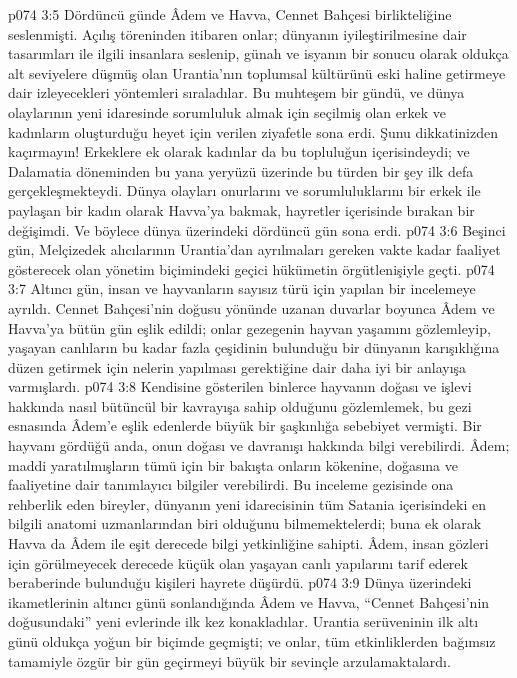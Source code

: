 \vs p074 3:5 Dördüncü günde Âdem ve Havva, Cennet Bahçesi birlikteliğine seslenmişti. Açılış töreninden itibaren onlar; dünyanın iyileştirilmesine dair tasarımları ile ilgili insanlara seslenip, günah ve isyanın bir sonucu olarak oldukça alt seviyelere düşmüş olan Urantia’nın toplumsal kültürünü eski haline getirmeye dair izleyecekleri yöntemleri sıraladılar. Bu muhteşem bir gündü, ve dünya olaylarının yeni idaresinde sorumluluk almak için seçilmiş olan erkek ve kadınların oluşturduğu heyet için verilen ziyafetle sona erdi. Şunu dikkatinizden kaçırmayın! Erkeklere ek olarak kadınlar da bu topluluğun içerisindeydi; ve Dalamatia döneminden bu yana yeryüzü üzerinde bu türden bir şey ilk defa gerçekleşmekteydi. Dünya olayları onurlarını ve sorumluluklarını bir erkek ile paylaşan bir kadın olarak Havva’ya bakmak, hayretler içerisinde bırakan bir değişimdi. Ve böylece dünya üzerindeki dördüncü gün sona erdi.
\vs p074 3:6 Beşinci gün, Melçizedek alıcılarının Urantia’dan ayrılmaları gereken vakte kadar faaliyet gösterecek olan yönetim biçimindeki geçici hükümetin örgütlenişiyle geçti.
\vs p074 3:7 Altıncı gün, insan ve hayvanların sayısız türü için yapılan bir incelemeye ayrıldı. Cennet Bahçesi’nin doğusu yönünde uzanan duvarlar boyunca Âdem ve Havva’ya bütün gün eşlik edildi; onlar gezegenin hayvan yaşamını gözlemleyip, yaşayan canlıların bu kadar fazla çeşidinin bulunduğu bir dünyanın karışıklığına düzen getirmek için nelerin yapılması gerektiğine dair daha iyi bir anlayışa varmışlardı.
\vs p074 3:8 Kendisine gösterilen binlerce hayvanın doğası ve işlevi hakkında nasıl bütüncül bir kavrayışa sahip olduğunu gözlemlemek, bu gezi esnasında Âdem’e eşlik edenlerde büyük bir şaşkınlığa sebebiyet vermişti. Bir hayvanı gördüğü anda, onun doğası ve davranışı hakkında bilgi verebilirdi. Âdem; maddi yaratılmışların tümü için bir bakışta onların kökenine, doğasına ve faaliyetine dair tanımlayıcı bilgiler verebilirdi. Bu inceleme gezisinde ona rehberlik eden bireyler, dünyanın yeni idarecisinin tüm Satania içerisindeki en bilgili anatomi uzmanlarından biri olduğunu bilmemektelerdi; buna ek olarak Havva da Âdem ile eşit derecede bilgi yetkinliğine sahipti. Âdem, insan gözleri için görülmeyecek derecede küçük olan yaşayan canlı yapılarını tarif ederek beraberinde bulunduğu kişileri hayrete düşürdü.
\vs p074 3:9 Dünya üzerindeki ikametlerinin altıncı günü sonlandığında Âdem ve Havva, “Cennet Bahçesi’nin doğusundaki” yeni evlerinde ilk kez konakladılar. Urantia serüveninin ilk altı günü oldukça yoğun bir biçimde geçmişti; ve onlar, tüm etkinliklerden bağımsız tamamiyle özgür bir gün geçirmeyi büyük bir sevinçle arzulamaktalardı.
